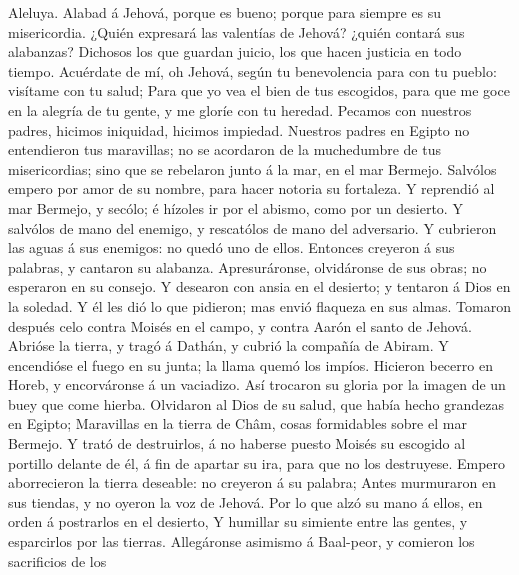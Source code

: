  Aleluya. Alabad á Jehová, porque es bueno; porque para
siempre es su misericordia.  ¿Quién expresará las
valentías de Jehová? ¿quién contará sus alabanzas? 
Dichosos los que guardan juicio, los que hacen justicia en todo tiempo.
 Acuérdate de mí, oh Jehová, según tu benevolencia para
con tu pueblo: visítame con tu salud;  Para que yo vea el
bien de tus escogidos, para que me goce en la alegría de tu gente, y me
gloríe con tu heredad.  Pecamos con nuestros padres,
hicimos iniquidad, hicimos impiedad.  Nuestros padres en
Egipto no entendieron tus maravillas; no se acordaron de la muchedumbre
de tus misericordias; sino que se rebelaron junto á la mar, en el mar
Bermejo.  Salvólos empero por amor de su nombre, para
hacer notoria su fortaleza.  Y reprendió al mar Bermejo, y
secólo; é hízoles ir por el abismo, como por un desierto.
 Y salvólos de mano del enemigo, y rescatólos de mano del
adversario.  Y cubrieron las aguas á sus enemigos: no
quedó uno de ellos.  Entonces creyeron á sus palabras, y
cantaron su alabanza.  Apresuráronse, olvidáronse de sus
obras; no esperaron en su consejo.  Y desearon con ansia
en el desierto; y tentaron á Dios en la soledad.  Y él
les dió lo que pidieron; mas envió flaqueza en sus almas.
 Tomaron después celo contra Moisés en el campo, y contra
Aarón el santo de Jehová.  Abrióse la tierra, y tragó á
Dathán, y cubrió la compañía de Abiram.  Y encendióse el
fuego en su junta; la llama quemó los impíos.  Hicieron
becerro en Horeb, y encorváronse á un vaciadizo.  Así
trocaron su gloria por la imagen de un buey que come hierba.
 Olvidaron al Dios de su salud, que había hecho grandezas
en Egipto;  Maravillas en la tierra de Châm, cosas
formidables sobre el mar Bermejo.  Y trató de
destruirlos, á no haberse puesto Moisés su escogido al portillo delante
de él, á fin de apartar su ira, para que no los destruyese.
 Empero aborrecieron la tierra deseable: no creyeron á su
palabra;  Antes murmuraron en sus tiendas, y no oyeron la
voz de Jehová.  Por lo que alzó su mano á ellos, en orden
á postrarlos en el desierto,  Y humillar su simiente
entre las gentes, y esparcirlos por las tierras. 
Allegáronse asimismo á Baal-peor, y comieron los sacrificios de los
